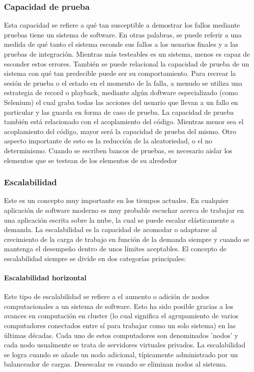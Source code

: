 \subsubsection{Capacidad de prueba} Esta capacidad se refiere a qué tan susceptible a demostrar los fallos mediante pruebas tiene un sistema de software. En otras palabras, se puede referir a una medida de qué tanto el sistema esconde sus fallos a los usuarios finales y a las pruebas de integración. Mientras más testeables es un sistema, menos es capaz de esconder estos errores. También se puede relacional la capacidad de prueba de un sistema con qué tan predecible puede ser su comportamiento. Para recrear la sesión de prueba o el estado en el momento de la falla, a menudo se utiliza una estrategia de record o playback, mediante algún doftware especializado (como Selenium) el cual graba todas las acciones del usuario que llevan a un fallo en particular y las guarda en forma de caso de prueba. La capacidad de prueba también está relacionado con el acoplamiento del código. Mientras menor sea el acoplamiento del código, mayor será la capacidad de prueba del mismo. Otro aspecto importante de esto es la reducción de la aleatoriedad, o el no determinismo. Cuando se escriben bancos de pruebas, es necesario aislar los elementos que se testean de los elementos de su alrededor


\subsubsection{Escalabilidad} Este es un concepto muy importante en los tiempos actuales. En cualquier aplicación de software moderno es muy probable escuchar acerca de trabajar en una aplicación escrita sobre la nube, la cual se puede escalar elásticamente a demanda. La escalabilidad es la capacidad de acomodar o adaptarse al crecimiento de la carga de trabajo en función de la demanda siempre y cuando se mantenga el desempeño dentro de unos límites aceptables. El concepto de escalabilidad siempre se divide en dos categorías principales: 


\paragraph{Escalabilidad horizontal} Este tipo de escalabilidad se refiere a el aumento o adición de nodos computacionales a un sistema de software. Esto ha sido posible gracias a los avances en computación en cluster (lo cual significa el agrupamiento de varios computadores conectados entre sí para trabajar como un solo sistema) en las últimas décadas. Cada uno de estos computadores son denominados ’nodos’ y cada nodo usualmente se trata de servidores virtuales privados. La escalabilidad se logra cuando se añade un nodo adicional, típicamente administrado por un balanceador de cargas. Desescalar es
cuando se eliminan nodos al sistema. 

